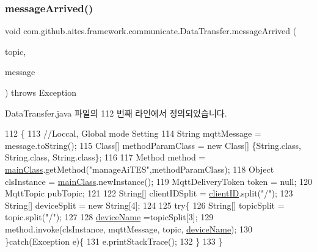 \subsubsection{\texorpdfstring{message\+Arrived()}{messageArrived()}}
{\footnotesize\ttfamily void com.\+github.\+aites.\+framework.\+communicate.\+Data\+Transfer.\+message\+Arrived (\begin{DoxyParamCaption}\item[{String}]{topic,  }\item[{Mqtt\+Message}]{message }\end{DoxyParamCaption}) throws Exception}



Data\+Transfer.\+java 파일의 112 번째 라인에서 정의되었습니다.


\begin{DoxyCode}
112                                                                                    \{
113         \textcolor{comment}{//Loccal, Global mode Setting}
114         String mqttMessage = message.toString();
115         Class[] methodParamClass = \textcolor{keyword}{new} Class[] \{String.class, String.class, String.class\};       
116         
117         Method method = \mbox{\hyperlink{classcom_1_1github_1_1aites_1_1framework_1_1communicate_1_1_data_transfer_aaf2d39cfff3efab5f33efb759918a3fe}{mainClass}}.getMethod(\textcolor{stringliteral}{"manageAiTES"},methodParamClass);     
118         Object clsInstance = \mbox{\hyperlink{classcom_1_1github_1_1aites_1_1framework_1_1communicate_1_1_data_transfer_aaf2d39cfff3efab5f33efb759918a3fe}{mainClass}}.newInstance();
119         MqttDeliveryToken token = null;
120         MqttTopic pubTopic;
121         
122         String[] clientIDSplit = \mbox{\hyperlink{classcom_1_1github_1_1aites_1_1framework_1_1communicate_1_1_data_transfer_a5aa04d84db8a69443856393e4fcaa941}{clientID}}.split(\textcolor{stringliteral}{"/"});
123         String[] deviceSplit = \textcolor{keyword}{new} String[4];
124         
125         \textcolor{keywordflow}{try}\{
126             String[] topicSplit = topic.split(\textcolor{stringliteral}{"/"});
127     
128             \mbox{\hyperlink{classcom_1_1github_1_1aites_1_1framework_1_1communicate_1_1_data_transfer_ae64991643e95a242bc9d5dc6819c6301}{deviceName}} =topicSplit[3];
129             method.invoke(clsInstance, mqttMessage, topic, \mbox{\hyperlink{classcom_1_1github_1_1aites_1_1framework_1_1communicate_1_1_data_transfer_ae64991643e95a242bc9d5dc6819c6301}{deviceName}});
130         \}\textcolor{keywordflow}{catch}(Exception e)\{
131             e.printStackTrace();
132         \}
133     \}
\end{DoxyCode}
\mbox{\label{classcom_1_1github_1_1aites_1_1framework_1_1communicate_1_1_data_transfer_a90bd50b85b1d619ef9bcf4720b3a1c27}} 
